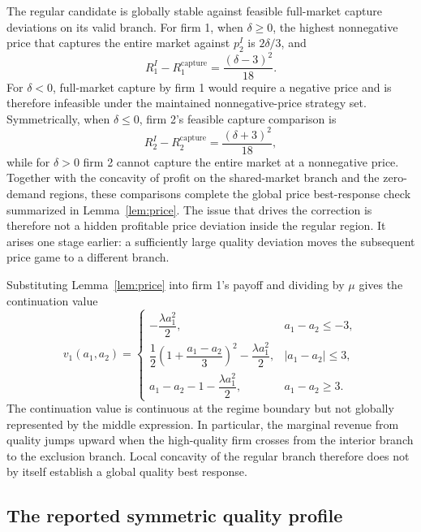 The regular candidate is globally stable against feasible full-market capture deviations on its valid branch. For firm 1, when $\delta\geq0$, the highest nonnegative price that captures the entire market against $p_2^I$ is $2\delta/3$, and
\begin{equation}\label{eq:square1}
 R_1^{I}-R_1^{\mathrm{capture}}
 =\frac{(\delta-3)^2}{18}.
\end{equation}
For $\delta<0$, full-market capture by firm 1 would require a negative price and is therefore infeasible under the maintained nonnegative-price strategy set. Symmetrically, when $\delta\leq0$, firm 2's feasible capture comparison is
\begin{equation}\label{eq:square2}
 R_2^{I}-R_2^{\mathrm{capture}}
 =\frac{(\delta+3)^2}{18},
\end{equation}
while for $\delta>0$ firm 2 cannot capture the entire market at a nonnegative price. Together with the concavity of profit on the shared-market branch and the zero-demand regions, these comparisons complete the global price best-response check summarized in Lemma~\ref{lem:price}. The issue that drives the correction is therefore not a hidden profitable price deviation inside the regular region. It arises one stage earlier: a sufficiently large quality deviation moves the subsequent price game to a different branch.

Substituting Lemma~\ref{lem:price} into firm 1's payoff and dividing by $\mu$ gives the continuation value
\begin{equation}\label{eq:v1-piecewise}
 v_1(a_1,a_2)=
 \begin{cases}
 -\dfrac{\lambda a_1^2}{2}, & a_1-a_2\leq -3,\\[2mm]
 \dfrac12\left(1+\dfrac{a_1-a_2}{3}\right)^2-\dfrac{\lambda a_1^2}{2}, & |a_1-a_2|\leq 3,\\[3mm]
 a_1-a_2-1-\dfrac{\lambda a_1^2}{2}, & a_1-a_2\geq 3.
 \end{cases}
\end{equation}
The continuation value is continuous at the regime boundary but not globally represented by the middle expression. In particular, the marginal revenue from quality jumps upward when the high-quality firm crosses from the interior branch to the exclusion branch. Local concavity of the regular branch therefore does not by itself establish a global quality best response.

\subsection{The reported symmetric quality profile}\label{subsec:symmetric}

